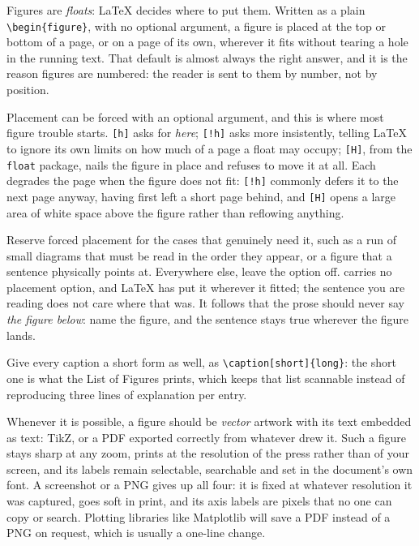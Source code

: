 Figures are \emph{floats}: LaTeX decides where to put them. Written as a plain
\texttt{\textbackslash begin\{figure\}}, with no optional argument, a figure is
placed at the top or bottom of a page, or on a page of its own, wherever it
fits without tearing a hole in the running text. That default is almost always
the right answer, and it is the reason figures are numbered: the reader is sent
to them by number, not by position.

Placement can be forced with an optional argument, and this is where most
figure trouble starts. \texttt{[h]} asks for \emph{here}; \texttt{[!h]} asks
more insistently, telling LaTeX to ignore its own limits on how much of a page
a float may occupy; \texttt{[H]}, from the \texttt{float} package, nails the
figure in place and refuses to move it at all. Each degrades the page when the
figure does not fit: \texttt{[!h]} commonly defers it to the next page anyway,
having first left a short page behind, and \texttt{[H]} opens a large area of
white space above the figure rather than reflowing anything.

Reserve forced placement for the cases that genuinely need it, such as a run of
small diagrams that must be read in the order they appear, or a figure that a
sentence physically points at. Everywhere else, leave the option off.
 carries no placement option, and LaTeX has put it
wherever it fitted; the sentence you are reading does not care where that was.
It follows that the prose should never say \emph{the figure below}: name the
figure, and the sentence stays true wherever the figure lands.

Give every caption a short form as well, as
\texttt{\textbackslash caption[short]\{long\}}: the short one is what the List
of Figures prints, which keeps that list scannable instead of reproducing three
lines of explanation per entry.

Whenever it is possible, a figure should be \emph{vector} artwork with its
text embedded as text: TikZ, or a PDF exported correctly from whatever drew
it. Such a figure stays sharp at any zoom, prints at the resolution of the
press rather than of your screen, and its labels remain selectable, searchable
and set in the document's own font. A screenshot or a PNG gives up all four:
it is fixed at whatever resolution it was captured, goes soft in print, and its
axis labels are pixels that no one can copy or search. Plotting libraries like
Matplotlib will save a PDF instead of a PNG on request, which is usually a
one-line change.

